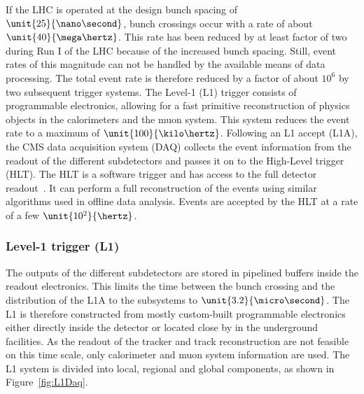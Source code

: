 If the LHC is operated at the design bunch spacing of $\unit{25}{\nano\second}$, bunch crossings occur with a rate of about $\unit{40}{\mega\hertz}$. This rate has been reduced by at least factor of two during Run I of the LHC because of the increased bunch spacing. Still, event rates of this magnitude can not be handled by the available means of data processing. The total event rate is therefore reduced by a factor of about $10^6$ by two subsequent trigger systems. The Level-1 (L1) trigger consists of programmable electronics, allowing for a fast primitive reconstruction of physics objects in the calorimeters and the muon system. This system reduces the event rate to a maximum of $\unit{100}{\kilo\hertz}$. Following an L1 accept (L1A), the CMS data acquisition system (DAQ) collects the event information from the readout of the different subdetectors and passes it on to the High-Level trigger (HLT). The HLT is a software trigger and has access to the full detector readout~\cite{Adam:2005zf}. It can perform a full reconstruction of the events using similar algorithms used in offline data analysis. Events are accepted by the HLT at a rate of a few $\unit{10^2}{\hertz}$.  

\subsubsection*{Level-1 trigger (L1)}
The outputs of the different subdetectors are stored in pipelined buffers inside the readout electronics. This limits the time between the bunch crossing and the distribution of the L1A to the subsystems to $\unit{3.2}{\micro\second}$. The L1 is therefore constructed from mostly custom-built programmable electronics either directly inside the detector or located close by in the underground facilities. As the readout of the tracker and track reconstruction are not feasible on this time scale, only calorimeter and muon system information are used. The L1 system is divided into local, regional and global components, as shown in Figure~\ref{fig:L1Daq}. 

